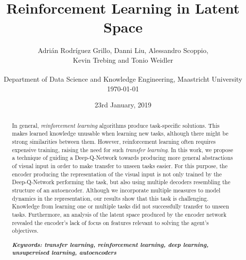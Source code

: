 \documentclass[10pt,a4paper]{article}
\title{Reinforcement Learning in Latent Space}
\date{23rd January, 2019}
\author{\normalfont Adrián Rodríguez Grillo, Danni Liu, Alessandro Scoppio,\\Kevin Trebing and Tonio Weidler\\\\
Department of Data Science and Knowledge Engineering, Maastricht University\\\today}
\begin{document}
\maketitle

\begin{abstract}

In general, \textit{reinforcement learning} algorithms produce task-specific solutions. This makes learned knowledge unusable when learning new tasks, although there might be strong similarities between them. However, reinforcement learning often requires expensive training, raising the need for such \textit{transfer learning}. In this work, we propose a technique of guiding a Deep-Q-Network towards producing more general abstractions of visual input in order to make transfer to unseen tasks easier. For this purpose, the encoder producing the representation of the visual input is not only trained by the Deep-Q-Network performing the task, but also using multiple decoders resembling the structure of an autoencoder. Although we incorporate multiple measures to model dynamics in the representation, our results show that this task is challenging. Knowledge from learning one or multiple tasks did not successfully transfer to unseen tasks. Furthermore, an analysis of the latent space produced by the encoder network revealed the encoder's lack of focus on features relevant to solving the agent's objectives.

{{\it \bf Keywords: transfer learning, reinforcement learning, deep learning, unsupervised learning, autoencoders}}
\end{abstract}









{\tiny\printbibliography}

\clearpage
\raggedbottom
\appendix
\begin{appendix}
\end{appendix}
\end{document}
